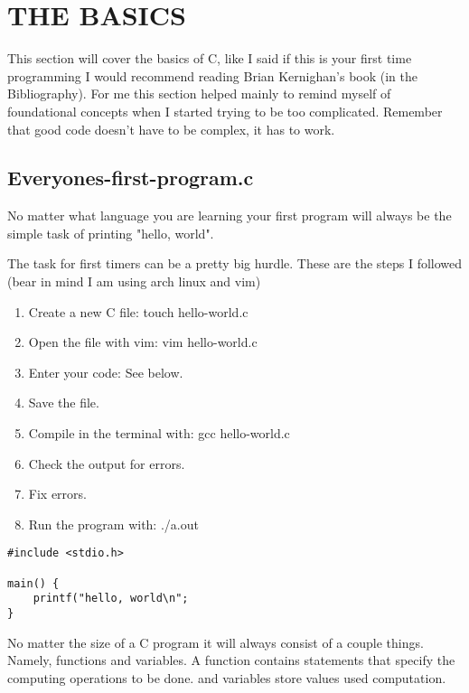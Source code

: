 \documentclass[a4paper]{article}
\begin{document}
\newpage
\section{THE BASICS}
This section will cover the basics of C, like I said if this is your first time programming I would recommend reading Brian Kernighan's book (in the Bibliography). For me this section helped mainly to remind myself of foundational concepts when I started trying to be too complicated. Remember that good code doesn't have to be complex, it has to work.

\subsection{Everyones-first-program.c}
No matter what language you are learning your first program will always be the simple task of printing "hello, world". \par \vspace{0.25cm}
The task for first timers can be a pretty big hurdle. These are the steps I followed (bear in mind I am using arch linux and vim)\vspace{0.25cm}
\begin{enumerate}
    \item Create a new C file: touch hello-world.c
    \item Open the file with vim: vim hello-world.c
    \item Enter your code: See below.
    \item Save the file.
    \item Compile in the terminal with: gcc hello-world.c
    \item Check the output for errors.
    \item Fix errors. 
    \item Run the program with: ./a.out 
\end{enumerate}

\begin{lstlisting}
#include <stdio.h>

main() {
    printf("hello, world\n";
}
\end{lstlisting}
No matter the size of a C program it will always consist of a couple things. Namely, functions and variables. A function contains statements that specify the computing operations to be done. and variables store values used computation. \par \vspace{0.25cm}
\end{document}

